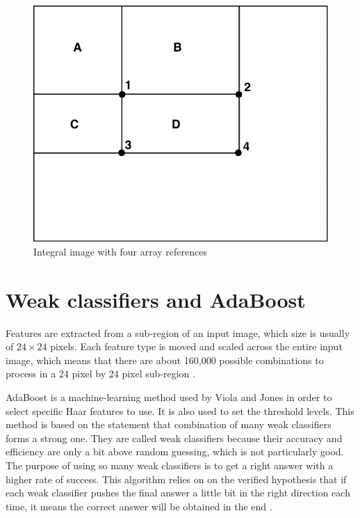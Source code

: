 \begin{figure}[!h]
\begin{center}
\noindent \includegraphics[scale=0.4]{figures/integral_image_four_array} 
\newline
\caption{Integral image with four array references}
\label{integral_image_four_array}
\end{center} 
\end{figure}

\section{Weak classifiers and AdaBoost}

\vspace{\baselineskip}
\noindent Features are extracted from a sub-region of an input image, which size is usually of $ 24\times24 $ pixels. Each feature type is moved and scaled across the entire input image, which means that there are about 160,000 possible combinations to process in a 24 pixel by 24 pixel sub-region \cite{SMY07}.
\newline

\noindent AdaBoost is a machine-learning method used by Viola and Jones in order to select specific Haar features to use. It is also used to set the threshold levels. This method is based on the statement that combination of many weak classifiers forms a strong one. They are called weak classifiers because their accuracy and efficiency are only a bit above random guessing, which is not particularly good. The purpose of using so many weak classifiers is to get a right answer with a higher rate of success. This algorithm relies on on the verified hypothesis that if each weak classifier pushes the final answer a little bit in the right direction each time, it means the correct answer will be obtained in the end \cite{HEW07}. 
\newline

